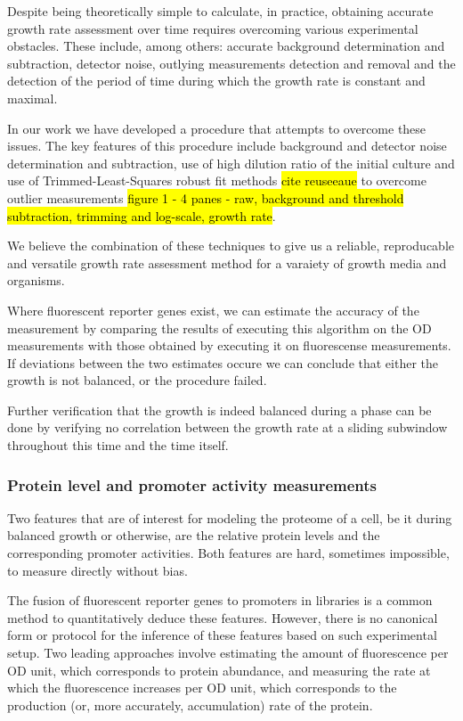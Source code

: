 \documentclass{report}
\begin{document}
Despite being theoretically simple to calculate, in practice, obtaining accurate growth rate assessment over time requires overcoming various experimental obstacles.
These include, among others: accurate background determination and subtraction, detector noise, outlying measurements detection and removal and the detection of the period of time during which the growth rate is constant and maximal.

In our work we have developed a procedure that attempts to overcome these issues.
The key features of this procedure include background and detector noise determination and subtraction, use of high dilution ratio of the initial culture and use of Trimmed-Least-Squares robust fit methods \hl{cite reuseeaue} to overcome outlier measurements \hl{figure 1 - 4 panes - raw, background and threshold subtraction, trimming and log-scale, growth rate}.

We believe the combination of these techniques to give us a reliable, reproducable and versatile growth rate assessment method for a varaiety of growth media and organisms.

Where fluorescent reporter genes exist, we can estimate the accuracy of the measurement by comparing the results of executing this algorithm on the OD measurements with those obtained by executing it on fluorescense measurements.
If deviations between the two estimates occure we can conclude that either the growth is not balanced, or the procedure failed.

Further verification that the growth is indeed balanced during a phase can be done by verifying no correlation between the growth rate at a sliding subwindow throughout this time and the time itself.
\subsubsection{Protein level and promoter activity measurements}
Two features that are of interest for modeling the proteome of a cell, be it during balanced growth or otherwise, are the relative protein levels and the corresponding promoter activities.
Both features are hard, sometimes impossible, to measure directly without bias.

The fusion of fluorescent reporter genes to promoters in libraries is a common method to quantitatively deduce these features.
However, there is no canonical form or protocol for the inference of these features based on such experimental setup.
Two leading approaches involve estimating the amount of fluorescence per OD unit, which corresponds to protein abundance, and measuring the rate at which the fluorescence increases per OD unit, which corresponds to the production (or, more accurately, accumulation) rate of the protein.
\end{document}
